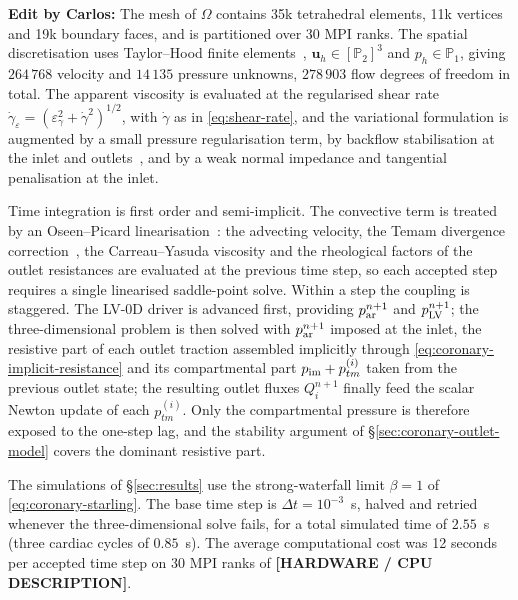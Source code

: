 \documentclass[lineno]{jfm}
\newcommand{\cbp}[1]{{\color{blue} \textbf{Edit by Carlos:} #1}}
\begin{document}
\cbp{
The mesh of $\Omega$ contains 35k tetrahedral elements, 11k vertices and 19k
boundary faces, and is partitioned over 30 MPI ranks. The spatial
discretisation uses Taylor--Hood finite elements~\citep{TaylorHood1973},
$\boldsymbol{u}_h\in[\mathbb{P}_2]^3$ and $p_h\in\mathbb{P}_1$, giving
$264\,768$ velocity and $14\,135$ pressure unknowns, $278\,903$ flow degrees
of freedom in total. The apparent viscosity is evaluated at the regularised
shear rate
$\dot{\gamma}_{\varepsilon}=(\varepsilon_{\gamma}^{2}+\dot{\gamma}^{2})^{1/2}$,
with $\dot{\gamma}$ as in \eqref{eq:shear-rate}, and the variational
formulation is augmented by a small pressure regularisation term, by backflow
stabilisation at the inlet and outlets~\citep{EsmailyMoghadam2011}, and by a
weak normal impedance and tangential penalisation at the inlet.

Time integration is first order and semi-implicit. The convective term is
treated by an Oseen--Picard linearisation~\citep{ElmanSilvesterWathen2014}:
the advecting velocity, the Temam divergence correction~\citep{Temam2001},
the Carreau--Yasuda viscosity and the rheological factors of the outlet
resistances are evaluated at the previous time step, so each accepted step
requires a single linearised saddle-point solve. Within a step the coupling
is staggered. The LV-0D driver is advanced first, providing
$p_{\rm ar}^{n+1}$ and $p_{\rm LV}^{n+1}$; the three-dimensional problem is
then solved with $p_{\rm ar}^{n+1}$ imposed at the inlet, the resistive part
of each outlet traction assembled implicitly through
\eqref{eq:coronary-implicit-resistance} and its compartmental part
$p_{\rm im}+p_{tm}^{(i)}$ taken from the previous outlet state; the resulting
outlet fluxes $Q_i^{n+1}$ finally feed the scalar Newton update of each
$p_{tm}^{(i)}$. Only the compartmental pressure is therefore exposed to the
one-step lag, and the stability argument of
\S\ref{sec:coronary-outlet-model} covers the dominant resistive part.

The simulations of \S\ref{sec:results} use the strong-waterfall limit
$\beta=1$ of \eqref{eq:coronary-starling}. The base time step is
$\Delta t=10^{-3}$~s, halved and retried whenever the three-dimensional solve
fails, for a total simulated time of $2.55$~s (three cardiac cycles of
$0.85$~s). The average computational cost was 12 seconds per accepted time
step on 30 MPI ranks of \textbf{[HARDWARE / CPU DESCRIPTION]}.
}
\end{document}
